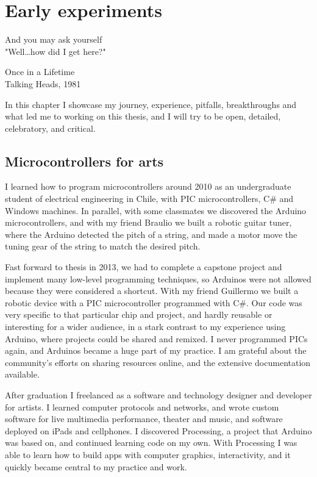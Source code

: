 \chapter{Early experiments}

\epigraph{And you may ask yourself \\ "Well\dots how did I get here?"}{Once in a Lifetime \\ Talking Heads, 1981}

In this chapter I showcase my journey, experience, pitfalls, breakthroughs and what led me to working on this  thesis, and I will try to be open, detailed, celebratory, and critical.

\section{Microcontrollers for arts}

I learned how to program microcontrollers around 2010 as an undergraduate student of electrical engineering in Chile, with PIC microcontrollers, C\# and Windows machines. In parallel, with some classmates we discovered the Arduino microcontrollers, and with my friend Braulio we built a robotic guitar tuner, where the Arduino detected the pitch of a string, and made a motor move the tuning gear of the string to match the desired pitch.

Fast forward to thesis in 2013, we had to complete a capstone project and implement many low-level programming techniques, so Arduinos were not allowed because they were considered a shortcut. With my friend Guillermo we built a robotic device with a PIC microcontroller programmed with C\#. Our code was very specific to that particular chip and project, and hardly reusable or interesting for a wider audience, in a stark contrast to my experience using Arduino, where projects could be shared and remixed. I never programmed PICs again, and Arduinos became a huge part of my practice. I am grateful about the community's efforts on sharing resources online, and the extensive documentation available.

After graduation I freelanced as a software and technology designer and developer for artists. I learned computer protocols and networks, and wrote custom software for live multimedia performance, theater and music, and software deployed on iPads and cellphones. I discovered Processing, a project that Arduino was based on, and continued learning code on my own. With Processing I was able to learn how to build apps with computer graphics, interactivity, and it quickly became central to my practice and work.

